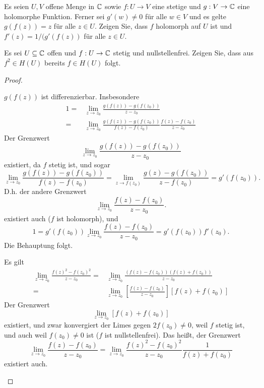 \begin{Problem}
	\begin{parts}
	\item Es seien $U,V$ offene Menge in $\mathbb{C}$ sowie $f:U\to V$ eine stetige und $g:V\to \mathbb{C}$ eine holomorphe Funktion. Ferner sei $g'(w)\neq 0$ f\"{u}r alle $w\in V$ und es gelte $g(f(z))=z$ f\"{u}r alle $z\in U$. Zeigen Sie, dass $f$ holomorph auf $U$ ist und $f'(z)=1 / (g'(f(z))$ f\"{u}r alle $z\in U$.
	\item Es sei $U\subseteq \mathbb{C}$ offen und $f:U\to \mathbb{C}$ stetig und nullstellenfrei. Zeigen Sie, dass aus $f^2\in H(U)$ bereits $f\in H(U)$ folgt.
	\end{parts}
\end{Problem}
\begin{proof}
	\begin{parts}
	\item $g(f(z))$ ist differenzierbar. Insbesondere
		\begin{align*}
			1=&\lim_{z \to z_0} \frac{g(f(z))-g(f(z_0))}{z-z_0}\\
			=&\lim_{z \to z_0} \frac{g(f(z))-g(f(z_0))}{f(z)-f(z_0)}\frac{f(z)-f(z_0)}{z-z_0}
		\end{align*}
		Der Grenzwert
		\[
		\lim_{z \to z_0} \frac{g(f(z))-g(f(z_0))}{z-z_0}
	\]
	existiert, da $f$ stetig ist, und sogar
	\[
		\lim_{z \to z_0} \frac{g(f(z))-g(f(z_0))}{f(z)-f(z_0)}=\lim_{z \to f(z_0)} \frac{g(z)-g(f(z_0))}{z-f(z_0)}=g'(f(z_0))
	.\] 
	D.h. der andere Grenzwert 
\[
\lim_{z \to z_0} \frac{f(z)-f(z_0)}{z-z_0}
.\] 
	existiert auch ($f$ ist holomorph), und
	\[
	1=g'(f(z_0)) \lim_{z \to z_0} \frac{f(z)-f(z_0)}{z-z_0}=g'(f(z_0)) f'(z_0)
	.\]
	Die Behauptung folgt.
\item Es gilt
	\begin{align*}
		\lim_{z \to z_0} \frac{f(z)^2-f(z_0)^2}{z-z_0}=& \lim_{z \to z_0} \frac{(f(z)-f(z_0))(f(z)+f(z_0))}{z-z_0}\\
		=& \lim_{z \to z_0} \left[ \frac{f(z)-f(z_0)}{z-z_0} \right]\left[ f(z)+f(z_0) \right] 
	\end{align*}
	Der Grenzwert
	\[
	\lim_{z \to z_0} [f(z)+f(z_0)]
	\]
	existiert, und zwar konvergiert der Limes gegen $2f(z_0)\neq 0$, weil $f$ stetig ist, und auch weil $f(z_0)\neq 0$ ist ($f$ ist nullstellenfrei). Das heißt, der Grenzwert
	\[
	\lim_{z \to z_0} \frac{f(z)-f(z_0)}{z-z_0}=\lim_{z \to z_0} \frac{f(z)^2-f(z_0)^2}{z-z_0}\frac{1}{f(z)+f(z_0)}
	\]
	existiert auch.\qedhere
	\end{parts}
\end{proof}
